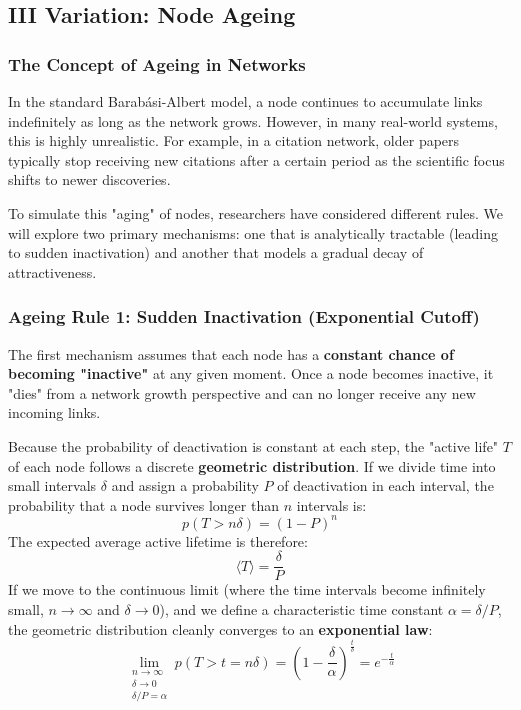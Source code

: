 \subsection{III Variation: Node Ageing}

\subsubsection{The Concept of Ageing in Networks}

In the standard Barabási-Albert model, a node continues to accumulate links indefinitely as long as the network grows. However, in many real-world systems, this is highly unrealistic. For example, in a citation network, older papers typically stop receiving new citations after a certain period as the scientific focus shifts to newer discoveries.

To simulate this "aging" of nodes, researchers have considered different rules. We will explore two primary mechanisms: one that is analytically tractable (leading to sudden inactivation) and another that models a gradual decay of attractiveness.

\subsubsection{Ageing Rule 1: Sudden Inactivation (Exponential Cutoff)}

The first mechanism assumes that each node has a \textbf{constant chance of becoming "inactive"} at any given moment. Once a node becomes inactive, it "dies" from a network growth perspective and can no longer receive any new incoming links.

Because the probability of deactivation is constant at each step, the "active life" \( T \) of each node follows a discrete \textbf{geometric distribution}. If we divide time into small intervals \( \delta \) and assign a probability \( P \) of deactivation in each interval, the probability that a node survives longer than \( n \) intervals is:
\[
    p(T > n\delta) = (1 - P)^n
\]
The expected average active lifetime is therefore:
\[
    \langle T \rangle = \frac{\delta}{P}
\]
If we move to the continuous limit (where the time intervals become infinitely small, \( n \to \infty \) and \( \delta \to 0 \)), and we define a characteristic time constant \( \alpha = \delta / P \), the geometric distribution cleanly converges to an \textbf{exponential law}:
\[
    \lim_{\substack{n \to \infty \\ \delta \to 0 \\ \delta/P = \alpha}} p(T > t = n\delta) = \left(1 - \frac{\delta}{\alpha}\right)^{\frac{t}{\delta}} = e^{-\frac{t}{\alpha}}
\]

